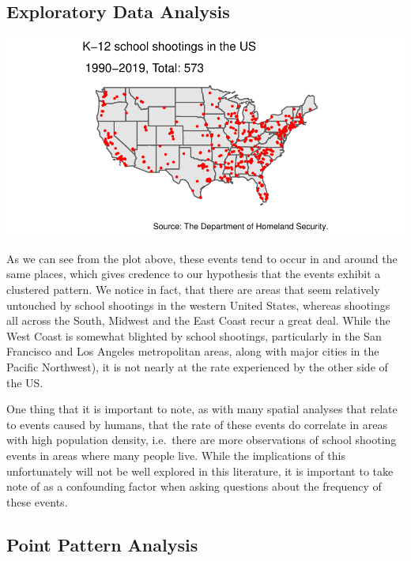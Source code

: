 \documentclass[
  12pt,
]{article}
\begin{document}
\hypertarget{exploratory-data-analysis}{%
\subsection{Exploratory Data Analysis}\label{exploratory-data-analysis}}

\includegraphics{JStevenRaquel_STATS295_Final_files/figure-latex/plot-point-pattern-9019-1.pdf}

As we can see from the plot above, these events tend to occur in and
around the same places, which gives credence to our hypothesis that the
events exhibit a clustered pattern. We notice in fact, that there are
areas that seem relatively untouched by school shootings in the western
United States, whereas shootings all across the South, Midwest and the
East Coast recur a great deal. While the West Coast is somewhat blighted
by school shootings, particularly in the San Francisco and Los Angeles
metropolitan areas, along with major cities in the Pacific Northwest),
it is not nearly at the rate experienced by the other side of the US.

One thing that it is important to note, as with many spatial analyses
that relate to events caused by humans, that the rate of these events do
correlate in areas with high population density, i.e.~there are more
observations of school shooting events in areas where many people live.
While the implications of this unfortunately will not be well explored
in this literature, it is important to take note of as a confounding
factor when asking questions about the frequency of these events.

\hypertarget{point-pattern-analysis}{%
\subsection{Point Pattern Analysis}\label{point-pattern-analysis}}
\end{document}

